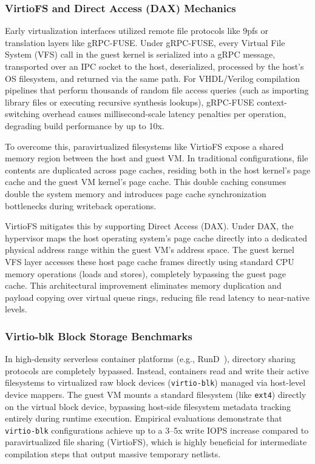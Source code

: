 \subsubsection{VirtioFS and Direct Access (DAX) Mechanics}
Early virtualization interfaces utilized remote file protocols like 9pfs or translation layers like gRPC-FUSE. Under gRPC-FUSE, every Virtual File System (VFS) call in the guest kernel is serialized into a gRPC message, transported over an IPC socket to the host, deserialized, processed by the host's OS filesystem, and returned via the same path. For VHDL/Verilog compilation pipelines that perform thousands of random file access queries (such as importing library files or executing recursive synthesis lookups), gRPC-FUSE context-switching overhead causes millisecond-scale latency penalties per operation, degrading build performance by up to 10x.

To overcome this, paravirtualized filesystems like VirtioFS expose a shared memory region between the host and guest VM. In traditional configurations, file contents are duplicated across page caches, residing both in the host kernel's page cache and the guest VM kernel's page cache. This double caching consumes double the system memory and introduces page cache synchronization bottlenecks during writeback operations.

VirtioFS mitigates this by supporting Direct Access (DAX). Under DAX, the hypervisor maps the host operating system's page cache directly into a dedicated physical address range within the guest VM's address space. The guest kernel VFS layer accesses these host page cache frames directly using standard CPU memory operations (loads and stores), completely bypassing the guest page cache. This architectural improvement eliminates memory duplication and payload copying over virtual queue rings, reducing file read latency to near-native levels.

\subsubsection{Virtio-blk Block Storage Benchmarks}
In high-density serverless container platforms (e.g., RunD~\cite{Li2022RunD}), directory sharing protocols are completely bypassed. Instead, containers read and write their active filesystems to virtualized raw block devices (\texttt{virtio-blk}) managed via host-level device mappers. The guest VM mounts a standard filesystem (like \texttt{ext4}) directly on the virtual block device, bypassing host-side filesystem metadata tracking entirely during runtime execution. Empirical evaluations demonstrate that \texttt{virtio-blk} configurations achieve up to a 3--5x write IOPS increase compared to paravirtualized file sharing (VirtioFS), which is highly beneficial for intermediate compilation steps that output massive temporary netlists.

